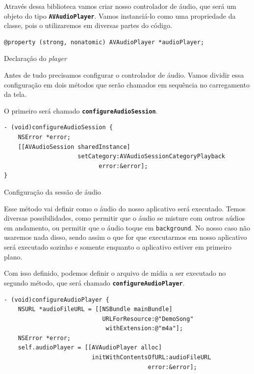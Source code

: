 \documentclass[a4paper,12pt,brazil,doubleside]{book}
\begin{document}
\begin{singlespace}
Através dessa biblioteca vamos criar nosso controlador de áudio, que será um objeto do tipo \texttt{\textbf{AVAudioPlayer}}. Vamos instanciá-lo como uma propriedade da classe, pois o utilizaremos em diversas partes do código.

\begin{listing}[H]
\begin{verbatim}
@property (strong, nonatomic) AVAudioPlayer *audioPlayer;
\end{verbatim}
\caption{Declaração do \emph{player}}
\end{listing}


Antes de tudo precisamos configurar o controlador de áudio. Vamos dividir essa configuração em dois métodos que serão chamados em sequência no carregamento da tela.

O primeiro será chamado \texttt{\textbf{configureAudioSession}}.

\begin{listing}[H]
\begin{verbatim}
- (void)configureAudioSession {
    NSError *error;
    [[AVAudioSession sharedInstance]
                     setCategory:AVAudioSessionCategoryPlayback
                           error:&error];
}
\end{verbatim}
\caption{Configuração da sessão de áudio}
\end{listing}


Esse método vai definir como o áudio do nosso aplicativo será executado. Temos diversas possibilidades, como permitir que o áudio se misture com outros aúdios em andamento, ou permitir que o áudio toque em \texttt{background}. No nosso caso não usaremos nada disso, sendo assim o que for que executarmos em nosso aplicativo será executado sozinho e somente enquanto o aplicativo estiver em primeiro plano.

Com isso definido, podemos definir o arquivo de mídia a ser executado no segundo método, que será chamado \texttt{\textbf{configureAudioPlayer}}.

\begin{listing}[H]
\begin{verbatim}
- (void)configureAudioPlayer {
    NSURL *audioFileURL = [[NSBundle mainBundle]
                            URLForResource:@"DemoSong"
                             withExtension:@"m4a"];
    NSError *error;
    self.audioPlayer = [[AVAudioPlayer alloc]
                         initWithContentsOfURL:audioFileURL
                                         error:&error];
    

\end{verbatim}
\end{listing}
\end{singlespace}
\end{document}
